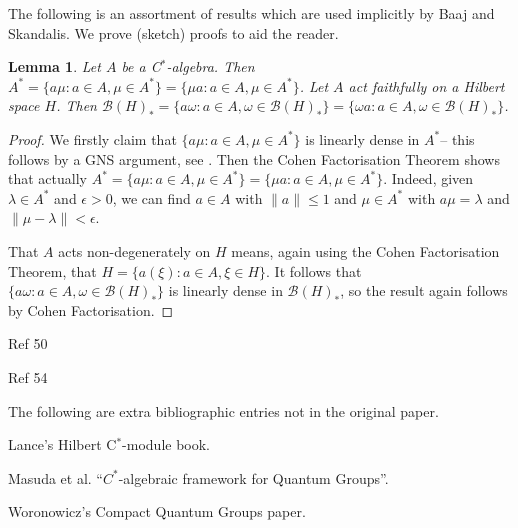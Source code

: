 \documentclass[a4paper,12pt]{article}
\theoremstyle{plain}
\newtheorem{lemma}[proposition]{Lemma}
\theoremstyle{definition}
\newcommand{\mc}{\mathcal}
\begin{document}
The following is an assortment of results which are used implicitly by
Baaj and Skandalis.  We prove (sketch) proofs to aid the reader.

\begin{lemma}\label{lem:ap1}
Let $A$ be a C$^*$-algebra.  Then $A^* = \{ a\mu : a\in A, \mu\in A^* \}
= \{ \mu a : a\in A, \mu\in A^* \}$.  Let $A$ act faithfully on a Hilbert
space $H$.  Then $\mc B(H)_* = \{ a\omega : a\in A, \omega\in\mc B(H)_* \}
= \{ \omega a : a\in A, \omega\in\mc B(H)_* \}$.
\end{lemma}
\begin{proof}
We firstly claim that $\{ a\mu : a\in A,\mu\in A^* \}$ is linearly dense in
$A^*$-- this follows by a GNS argument, see \cite[Appendix~A]{mnw}.
Then the Cohen Factorisation Theorem shows that actually
$A^* = \{ a\mu : a\in A, \mu\in A^* \} = \{ \mu a : a\in A, \mu\in A^* \}$.
Indeed, given $\lambda\in A^*$ and $\epsilon>0$, we can find $a\in A$ with
$\|a\|\leq 1$ and $\mu\in A^*$ with $a\mu = \lambda$ and
$\|\mu-\lambda\|<\epsilon$.

That $A$ acts non-degenerately on $H$ means, again using the Cohen Factorisation
Theorem, that $H = \{ a(\xi) : a\in A, \xi\in H \}$.  It follows that
$\{ a\omega : a\in A, \omega\in\mc B(H)_* \}$ is linearly dense in $\mc B(H)_*$,
so the result again follows by Cohen Factorisation.
\end{proof}

\begin{thebibliography}{99}












 Ref 50

 Ref 54

\medskip
\hspace{-4ex}The following are extra bibliographic entries not in the original paper.

 Lance's Hilbert C$^*$-module book.

 Masuda et al. ``$C^*$-algebraic framework for Quantum Groups''.

 Woronowicz's Compact Quantum Groups paper.

\end{thebibliography}
\end{document}
